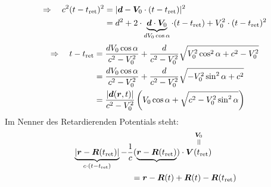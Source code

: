 \begin{enumerate}[i)]
\begin{minipage}{.6\linewidth}
\begin{align*}
		\end{align*}
	\end{minipage}%
	\begin{minipage}{.4\linewidth}
		\flushright
	\end{minipage}%
	\\[5pt]
	\begin{align*}
	\Rightarrow \quad c^2(t - t_{\textrm{ret}})^2 &= | \bm{d} - \bm{V}_0 \cdot (t - t_{\textrm{ret}})|^2\\
	&= d^2 + 2 \cdot \underbrace{\bm{d} \cdot \bm{V}_0}_{d V_0 \cos \alpha} \cdot (t - t_{\textrm{ret}}) + V_0^2 \cdot (t-t_{\textrm{ret}})^2
	\end{align*}
	\begin{align*}
	\Rightarrow \quad t - t_{\textrm{ret}} &= \frac{d V_0 \cos \alpha}{c^2 - V_0^2} + \frac{d}{c^2 - V_0^2} \sqrt{V_0^2 \cos^2 \alpha + c^2 - V_0^2} \\
	&= \frac{d V_0 \cos \alpha}{c^2 - V_0^2} + \frac{d}{c^2 - V_0^2} \sqrt{- V_0^2 \sin^2 \alpha + c^2}\\
	&= \frac{|\bm{d}(\bm{r},t)|}{c^2 - V_0^2} \left(V_0 \cos \alpha + \sqrt{c^2 - V_0^2 \sin^2 \alpha}\right)
	\end{align*}
	Im Nenner des Retardierenden Potentials steht:
	\begin{align*}
	& \ub{|\vec{r} - \vec{R}(t_{\tx{ret}})|}_{c \cdot ( t - t_{\tx{ret}})} - \frac{1}{c} (\ub{\vec{r} - \vec{R}(t_{\tx{ret}})}) \cdot \equaltoup{\vec{V}(t_{\tx{ret}})}{\vec{V}_0}\\
	& \quad \qquad \qquad \qquad = \vec{r} - \vec{R}(t) + \vec{R}(t) - \vec{R}(t_{\tx{ret}}) \\

\end{align*}
\end{enumerate}
